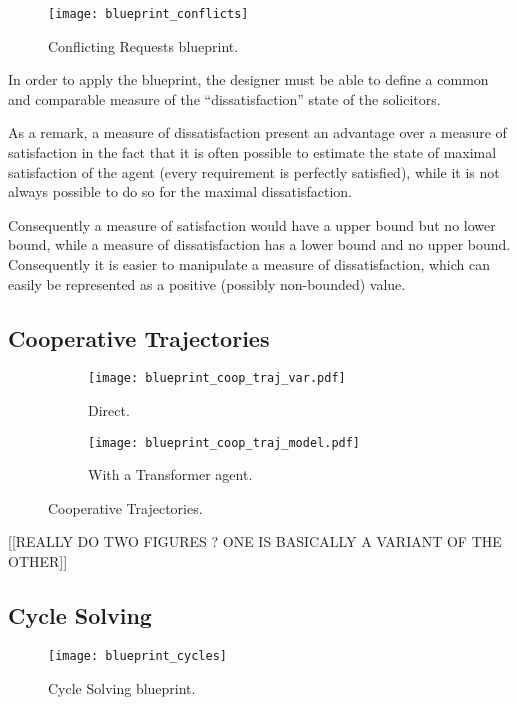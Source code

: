 \begin{figure}
\centering
\texttt{[image: blueprint\_conflicts]}
\caption{Conflicting Requests blueprint.}\label{blueprint_conflicts}
\end{figure}

In order to apply the blueprint, the designer must be able to define a common and comparable measure of the \enquote{dissatisfaction} state of the solicitors.

As a remark, a measure of dissatisfaction present an advantage over a measure of satisfaction in the fact that it is often possible to estimate the state of maximal satisfaction of the agent (every requirement is perfectly satisfied), while it is not always possible to do so for the maximal dissatisfaction. 

Consequently a measure of satisfaction would have a upper bound but no lower bound, while a measure of dissatisfaction has a lower bound and no upper bound. Consequently it is easier to manipulate a measure of dissatisfaction, which can easily be represented as a positive (possibly non-bounded) value.

\subsection{Cooperative Trajectories}

\begin{figure}
\centering
	\begin{subfigure}{0.49\textwidth}
		\centering
		\texttt{[image: blueprint\_coop\_traj\_var.pdf]}
		\caption{Direct.}
	\end{subfigure}
	\begin{subfigure}{0.49\textwidth}
		\centering
		\texttt{[image: blueprint\_coop\_traj\_model.pdf]}
		\caption{With a Transformer agent.}
	\end{subfigure}
\caption{Cooperative Trajectories.}\label{blueprint_coop_traj}
\end{figure}

[[REALLY DO TWO FIGURES ? ONE IS BASICALLY A VARIANT OF THE OTHER]]

\subsection{Cycle Solving}

\begin{figure}
\centering
\texttt{[image: blueprint\_cycles]}
\caption{Cycle Solving blueprint.}\label{blueprint_cycles}
\end{figure}

